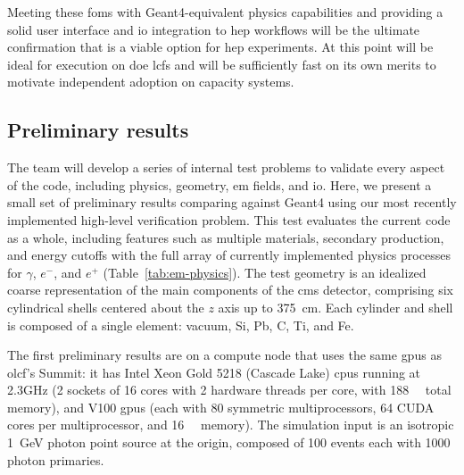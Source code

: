 Meeting these \acp{fom} with Geant4-equivalent physics capabilities and
providing a solid user interface and \ac{io} integration to \ac{hep} workflows
will be the ultimate confirmation that \celeritas is a viable option for
\ac{hep} experiments. At this point \celeritas will be ideal for execution on
\ac{doe} \acp{lcf} and will be sufficiently fast on its own merits to motivate
independent adoption on capacity systems.

\subsection{Preliminary results}

The \celeritas team will develop a series of internal test problems to validate
every aspect of the code, including physics, geometry, \ac{em} fields, and
\ac{io}. Here, we present a small set of preliminary results comparing
\celeritas against Geant4 using our most recently implemented high-level
verification problem. This test evaluates the current code as a whole, including
features such as multiple materials, secondary production, and energy cutoffs
with the full array of currently implemented physics processes for $\gamma$,
$e^-$, and $e^+$ (Table~\ref{tab:em-physics}). The test geometry is an idealized
coarse representation of the main components of the \ac{cms} detector,
comprising six cylindrical shells centered about the $z$ axis up to
\SI{375}{\centi\meter}. Each cylinder and shell is composed of a single element:
vacuum, Si, Pb, C, Ti, and Fe. 

The first preliminary results are on a compute node that uses the same \acp{gpu}
as \ac{olcf}'s Summit: it has Intel Xeon Gold 5218 (Cascade Lake) \acp{cpu}
running at 2.3GHz (2 sockets of 16 cores with 2 hardware threads per core, with
\SI{188}{\giga\byte} total memory), and \nvidia V100 \acp{gpu} (each with 80
symmetric multiprocessors, 64 CUDA cores per multiprocessor, and
\SI{16}{\giga\byte} memory). The simulation input is an isotropic
\SI{1}{\giga\electronvolt} photon point source at the origin, composed of 100
events each with \num{1000} photon primaries.

